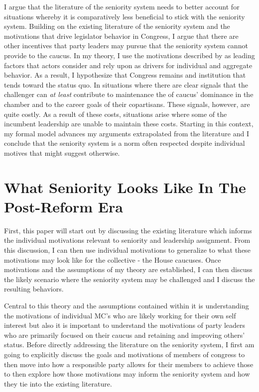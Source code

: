 \documentclass [12pt]{article}
\begin{document}
I argue that the literature of the seniority system needs to better account for situations whereby it is comparatively less beneficial to stick with the seniority system. Building on the existing literature of the seniority system and the motivations that drive legislator behavior in Congress, I argue that there are other incentives that party leaders may pursue that the seniority system cannot provide to the caucus. In my theory, I use the motivations described by  as leading factors that actors consider and rely upon as drivers for individual and aggregate behavior. As a result, I hypothesize that Congress remains and institution that tends toward the status quo. In situations where there are clear signals that the challenger can \textit{at least} contribute to maintenance the of caucus' dominance in the chamber and to the career goals of their copartisans. These signals, however, are quite costly. As a result of these costs, situations arise where some of the incumbent leadership are unable to maintain these costs. Starting in this context, my formal model advances my arguments extrapolated from the literature and I conclude that the seniority system is a norm often respected despite individual motives that might suggest otherwise.

\section*{What Seniority Looks Like In The Post-Reform Era}

First, this paper will start out by discussing the existing literature which informs the individual motivations relevant to seniority and leadership assignment. From this discussion, I can then use individual motivations to generalize to what these motivations may look like for the collective - the House caucuses. Once motivations and the assumptions of my theory are established, I can then discuss the likely scenario where the seniority system may be challenged and I discuss the resulting behaviors. 

Central to this theory and the assumptions contained within it is understanding the motivations of individual MC's who are likely working for their own self interest but also it is important to understand the motivations of party leaders who are primarily focused on their caucus and retaining and improving others' status. Before directly addressing the literature on the seniority system, I first am going to explicitly discuss the goals and motivations of members of congress to then move into how a responsible party allows for their members to achieve those to then explore how those motivations may inform the seniority system and how they tie into the existing literature.
\end{document}
